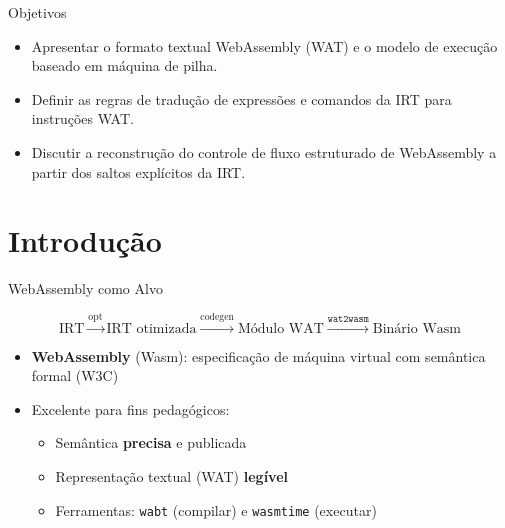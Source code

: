 \subtitle{\bf Aula 19 - Introdução}
\begin{frame}[t,plain]
    \titlepage
\end{frame}

\begin{frame}{Objetivos}

    \begin{itemize}
        \item
        Apresentar o formato textual WebAssembly (WAT) e o modelo de execução
        baseado em máquina de pilha.
        \item
        Definir as regras de tradução de expressões e comandos da IRT para
        instruções WAT.
        \item
        Discutir a reconstrução do controle de fluxo estruturado de
        WebAssembly a partir dos saltos explícitos da IRT.
    \end{itemize}
\end{frame}


\section{Introdução}\label{introduuxe7uxe3o}

\begin{frame}[fragile]{WebAssembly como Alvo}

    \[\text{IRT} \xrightarrow{\text{opt}} \text{IRT otimizada} \xrightarrow{\text{codegen}} \text{Módulo WAT} \xrightarrow{\texttt{wat2wasm}} \text{Binário Wasm}\]

    \begin{itemize}

        \item
        \textbf{WebAssembly} (Wasm): especificação de máquina virtual com
        semântica formal (W3C)
        \item
        Excelente para fins pedagógicos:

        \begin{itemize}

            \item
            Semântica \textbf{precisa} e publicada
            \item
            Representação textual (WAT) \textbf{legível}
            \item
            Ferramentas: \texttt{wabt} (compilar) e
            \texttt{wasmtime} (executar)
        \end{itemize}
    \end{itemize}
\end{frame}

